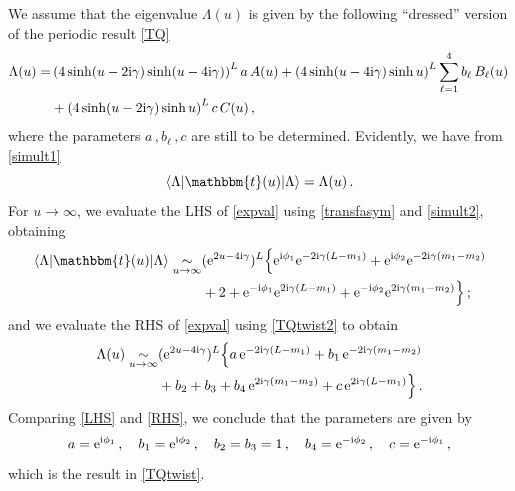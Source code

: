 \documentclass[12pt]{article}
\numberwithin{equation}{section}
\newcommand{\ri}{{\rm i}}
\newcommand{\re}{{\rm e}}
\begin{document}
We assume that the eigenvalue $\Lambda(u)$ is given by the following ``dressed'' version of the periodic result \eqref{TQ}
\begin{align}
    \Lambda(u) =& \left(4\sinh(u-2\ri\gamma)\sinh(u-4\ri\gamma)\right)^{L} a\, A(u)
               + \left(4 \sinh(u-4\ri\gamma) \sinh u\right)^L \sum_{\ell=1}^4 b_\ell\, B_\ell(u)\, \nonumber\\
               &+ \left(4\sinh(u-2\ri\gamma)\sinh u\right)^{L} c\, C(u) \,,
\label{TQtwist2}
\end{align}
where the parameters $a\,, b_\ell \,, c$ are still to be determined.
Evidently, we have from \eqref{simult1}
\begin{equation}
    \langle \Lambda | \mathbbm{t}(u) | \Lambda\rangle = \Lambda(u) \,.
    \label{expval}
\end{equation}
For $u\rightarrow\infty$, we evaluate the LHS of \eqref{expval} using \eqref{transfasym} and \eqref{simult2}, obtaining
\begin{align}
 \langle \Lambda | \mathbbm{t}(u) | \Lambda\rangle  
 \underset{u\rightarrow \infty}{\sim}   & (\re^{2u-4\ri\gamma})^L \Big\{ 
    \re^{\ri \phi_1} \re^{-2\ri\gamma (L-m_1)}
    +  \re^{\ri \phi_2} \re^{-2\ri\gamma (m_1-m_2)}\nonumber \\
   &  + 2
     + \re^{-\ri \phi_1} \re^{2\ri\gamma (L-m_1)}
    +  \re^{-\ri \phi_2} \re^{2\ri\gamma (m_1-m_2)}\Big\}
    \,;
    \label{LHS}
\end{align}
and we evaluate the RHS of \eqref{expval} using \eqref{TQtwist2} to obtain
\begin{align}
    \Lambda(u) \underset{u\rightarrow \infty}{\sim}   & 
    (\re^{2u-4\ri\gamma})^L \Big\{ 
    a\, \re^{-2\ri\gamma (L-m_1)}
    +  b_1\, \re^{-2\ri\gamma (m_1-m_2)}\nonumber \\
   &  + b_2 + b_3  
    +  b_4\, \re^{2\ri\gamma (m_1-m_2)}
    + c\, \re^{2\ri\gamma (L-m_1)}
 \Big\} \,.
 \label{RHS}
\end{align}
Comparing \eqref{LHS} and \eqref{RHS}, we conclude that the parameters are given by
\begin{equation}
    a = \re^{\ri \phi_1}\,, \quad b_1 = \re^{\ri \phi_2}\,, \quad b_2 = b_3 =1  \,, \quad b_4 = \re^{-\ri \phi_2}\,, \quad c = \re^{-\ri \phi_1}\,,
\end{equation}
which is the result in \eqref{TQtwist}.
\end{document}
